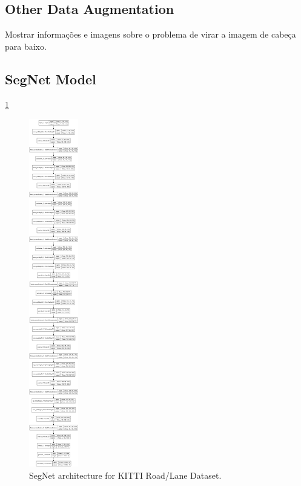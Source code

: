 \documentclass[10pt,twocolumn,letterpaper]{article}
\begin{document}
\subsection{Other Data Augmentation} \label{ssec:data_augmentation}

Mostrar informações e imagens sobre o problema de virar a imagem de cabeça para baixo.

\subsection{SegNet Model} \label{ssec:segnet_model}

\ref{fig:segnet_model}

\begin{figure}[ht]
  \centering
  \includegraphics[width=0.19\textwidth]{kitti_segnet_plot.png}
  \caption{SegNet architecture for KITTI Road/Lane Dataset.}
  \label{fig:segnet_model}
\end{figure}
\end{document}
